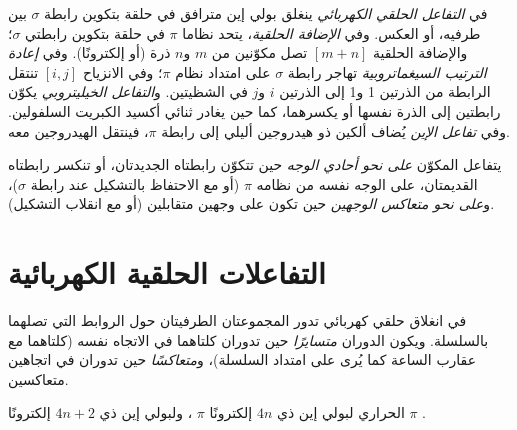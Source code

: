 \begin{definition}\label{def:b3:pericyclic:families}
في \emph{التفاعل الحلقي الكهربائي} ينغلق بولي إين
مترافق في حلقة بتكوين رابطة $\sigma$ بين طرفيه، أو
العكس. وفي \emph{الإضافة الحلقية}، يتحد نظاما $\pi$
في حلقة بتكوين رابطتي $\sigma$؛ والإضافة الحلقية $[m + n]$ تصل مكوّنين
من $m$ و$n$ ذرة (أو إلكترونًا). وفي \emph{إعادة الترتيب
السيغماتروبية} تهاجر رابطة $\sigma$ على امتداد نظام $\pi$؛
وفي الانزياح $[i, j]$ تنتقل الرابطة من الذرتين 1 و1 إلى الذرتين $i$ و$j$
في الشظيتين. و\emph{التفاعل الخيليتروبي}
يكوّن رابطتين إلى الذرة نفسها أو يكسرهما، كما حين يغادر ثنائي أكسيد الكبريت
السلفولين. وفي \emph{تفاعل الإين} يُضاف ألكين
ذو هيدروجين أليلي إلى رابطة $\pi$، فينتقل الهيدروجين معه.
\end{definition}

\begin{definition}\label{def:b3:pericyclic:faciality}
يتفاعل المكوّن \emph{على نحو أحادي الوجه} حين تتكوّن رابطتاه
الجديدتان، أو تنكسر رابطتاه القديمتان، على الوجه نفسه من نظامه $\pi$ (أو مع
الاحتفاظ بالتشكيل عند رابطة $\sigma$)، و\emph{على نحو متعاكس الوجهين} حين تكون
على وجهين متقابلين (أو مع انقلاب التشكيل).
\end{definition}

\section{التفاعلات الحلقية الكهربائية}

\begin{definition}\label{def:b3:pericyclic:rotation-modes}
في انغلاق حلقي كهربائي تدور المجموعتان الطرفيتان حول الروابط
التي تصلهما بالسلسلة. ويكون الدوران \emph{متسايرًا}
حين تدوران كلتاهما في الاتجاه نفسه (كلتاهما مع عقارب الساعة كما يُرى على امتداد السلسلة)، 
و\emph{متعاكسًا} حين تدوران في اتجاهين متعاكسين.
\end{definition}

\begin{theorem}\label{thm:b3:pericyclic:electrocyclic}
 الحراري لبولي إين ذي $4n$ إلكترونًا $\pi$ ، ولبولي إين ذي $4n + 2$ إلكترونًا $\pi$ .
\end{theorem}

